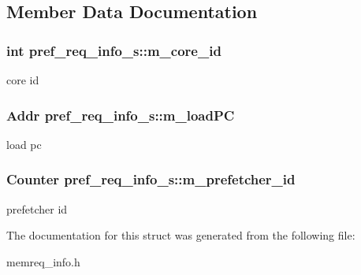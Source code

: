 \subsection{Member Data Documentation}
\hypertarget{structpref__req__info__s_a44832dde3aa0bc84eb518a4d3e18a13c}{
\subsubsection[{m\_\-core\_\-id}]{\setlength{\rightskip}{0pt plus 5cm}int {\bf pref\_\-req\_\-info\_\-s::m\_\-core\_\-id}}}
\label{structpref__req__info__s_a44832dde3aa0bc84eb518a4d3e18a13c}
core id \hypertarget{structpref__req__info__s_a4388bf64a8a3106118239aaf9e581494}{
\subsubsection[{m\_\-loadPC}]{\setlength{\rightskip}{0pt plus 5cm}Addr {\bf pref\_\-req\_\-info\_\-s::m\_\-loadPC}}}
\label{structpref__req__info__s_a4388bf64a8a3106118239aaf9e581494}
load pc \hypertarget{structpref__req__info__s_ae23c9357502e5b514a7024d559d83c93}{
\subsubsection[{m\_\-prefetcher\_\-id}]{\setlength{\rightskip}{0pt plus 5cm}Counter {\bf pref\_\-req\_\-info\_\-s::m\_\-prefetcher\_\-id}}}
\label{structpref__req__info__s_ae23c9357502e5b514a7024d559d83c93}
prefetcher id 

The documentation for this struct was generated from the following file:\begin{DoxyCompactItemize}
\item 
memreq\_\-info.h\end{DoxyCompactItemize}
